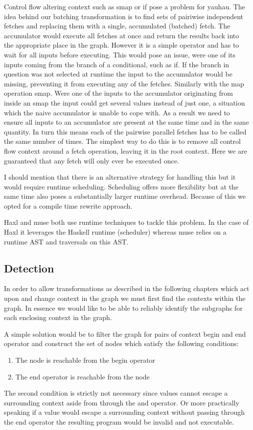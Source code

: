 Control flow altering context such as smap or if pose a problem for yauhau.
The idea behind our batching transformation is to find sets of pairiwise independent fetches and replacing them with a single, accumulated (batched) fetch.
The accumulator would execute all fetches at once and return the results back into the appropriate place in the graph.
However it is a simple operator and has to wait for all inputs before executing.
This would pose an issue, were one of its inputs coming from the branch of a conditional, such as if.
If the branch in question was not selected at runtime the input to the accumulator would be missing, preventing it from executing any of the fetches.
Similarly with the map operation smap.
Were one of the inputs to the accumulator originating from inside an smap the input could get several values instead of just one, a situation which the naive accumulator is unable to cope with.
As a result we need to ensure all inputs to an accumulator are present at the same time and in the same quantity.
In turn this means each of the pairwise parallel fetches has to be called the same number of times.
The simplest way to do this is to remove all control flow context around a fetch operation, leaving it in the root context.
Here we are guaranteed that any fetch will only ever be executed once.

I should mention that there is an alternative strategy for handling this but it would require runtime scheduling.
Scheduling offers more flexibility but at the same time also poses a substantially larger runtime overhead.
Because of this we opted for a compile time rewrite approach.

Haxl and muse both use runtime techniques to tackle this problem.
In the case of Haxl it leverages the Haskell runtime (scheduler) whereas muse relies on a runtime AST and traversals on this AST.

\subsection{Detection}

In order to allow transformations as described in the following chapters which act upon and change context in the graph we must first find the contexts within the graph.
In essence we would like to be able to reliably identify the subgraphs for each enclosing context in the graph.

A simple solution would be to filter the graph for pairs of context begin and end operator and construct the set of nodes which satisfy the following conditions:
\begin{enumerate}
    \item The node is reachable from the begin operator
    \item The end operator is reachable from the node
\end{enumerate}
The second condition is strictly not necessary since values cannot escape a surrounding context aside from through the and operator.
Or more practically speaking if a value would escape a surrounding context without passing through the end operator the resulting program would be invalid and not executable.

